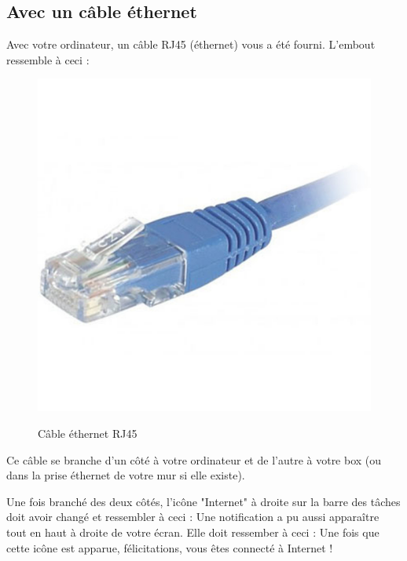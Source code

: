 \documentclass[12pt]{book}
\begin{document}
	\subsection{Avec un câble éthernet}
		Avec votre ordinateur, un câble RJ45 (éthernet) vous a été fourni.
		L'embout ressemble à ceci :
		\begin{figure}[h]
			\centering
			\includegraphics[scale=0.05]{include/rj45.jpg}
			\label{fig:rj45}
			\caption{Câble éthernet RJ45}
		\end{figure}\par
		Ce câble se branche d'un côté à votre ordinateur et de l'autre à votre box (ou dans la prise éthernet de votre mur si elle existe).\par
		Une fois branché des deux côtés, l'icône "Internet" à droite sur la barre des tâches doit avoir changé et ressembler à ceci :
		\newline
		Une notification a pu aussi apparaître tout en haut à droite de votre écran.
		Elle doit ressember à ceci :
		\newline
		Une fois que cette icône est apparue, félicitations, vous êtes connecté à Internet !
\end{document}
